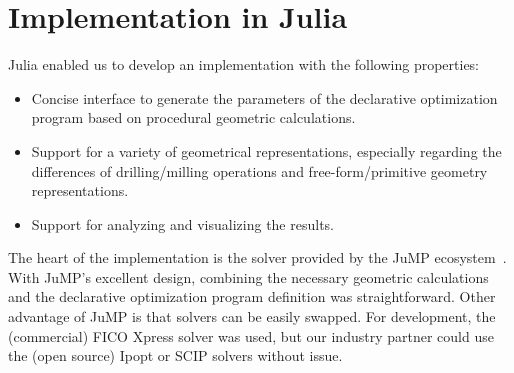 \documentclass{juliacon}
\begin{document}
\section{Implementation in Julia}
\label{sec:approach}


Julia enabled us to develop an implementation with the following properties:
\begin{itemize}
	\item Concise interface to generate the parameters of the declarative optimization program based on procedural geometric calculations.
	\item Support for a variety of geometrical representations, especially regarding the differences of drilling/milling operations and free-form/primitive geometry representations.
	\item Support for analyzing and visualizing the results.
\end{itemize}


The heart of the implementation is the solver provided by the JuMP ecosystem~\cite{Lubin2023}.
With JuMP's excellent design, combining the necessary geometric calculations and the declarative optimization program definition was straightforward.
Other advantage of JuMP is that solvers can be easily swapped.
For development, the (commercial) FICO Xpress solver was used, but our industry partner could use the (open source) Ipopt or SCIP solvers without issue.
\end{document}
